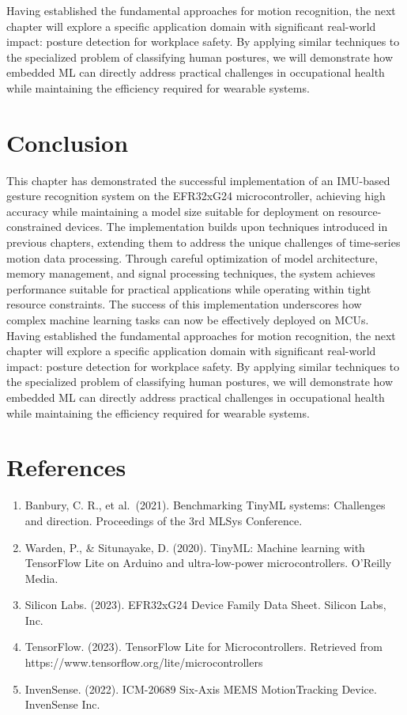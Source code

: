 \documentclass[
  9pt,
  letterpaper,
  abstract,
  titlepage]{scrbook}
\begin{document}
Having established the fundamental approaches for motion recognition,
the next chapter will explore a specific application domain with
significant real-world impact: posture detection for workplace safety.
By applying similar techniques to the specialized problem of classifying
human postures, we will demonstrate how embedded ML can directly address
practical challenges in occupational health while maintaining the
efficiency required for wearable systems.

\section{Conclusion}\label{conclusion-3}

This chapter has demonstrated the successful implementation of an
IMU-based gesture recognition system on the EFR32xG24 microcontroller,
achieving high accuracy while maintaining a model size suitable for
deployment on resource-constrained devices. The implementation builds
upon techniques introduced in previous chapters, extending them to
address the unique challenges of time-series motion data processing.
Through careful optimization of model architecture, memory management,
and signal processing techniques, the system achieves performance
suitable for practical applications while operating within tight
resource constraints. The success of this implementation underscores how
complex machine learning tasks can now be effectively deployed on MCUs.
Having established the fundamental approaches for motion recognition,
the next chapter will explore a specific application domain with
significant real-world impact: posture detection for workplace safety.
By applying similar techniques to the specialized problem of classifying
human postures, we will demonstrate how embedded ML can directly address
practical challenges in occupational health while maintaining the
efficiency required for wearable systems.

\section{References}\label{references-1}

\begin{enumerate}
\def\labelenumi{\arabic{enumi}.}
\item
  Banbury, C. R., et al.~(2021). Benchmarking TinyML systems: Challenges
  and direction. Proceedings of the 3rd MLSys Conference.
\item
  Warden, P., \& Situnayake, D. (2020). TinyML: Machine learning with
  TensorFlow Lite on Arduino and ultra-low-power microcontrollers.
  O'Reilly Media.
\item
  Silicon Labs. (2023). EFR32xG24 Device Family Data Sheet. Silicon
  Labs, Inc.
\item
  TensorFlow. (2023). TensorFlow Lite for Microcontrollers. Retrieved
  from https://www.tensorflow.org/lite/microcontrollers
\item
  InvenSense. (2022). ICM-20689 Six-Axis MEMS MotionTracking Device.
  InvenSense Inc.
\end{enumerate}
\end{document}
